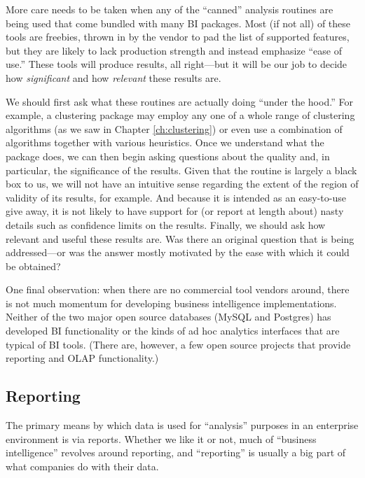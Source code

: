 More care needs to be taken when any of the ``canned'' analysis
routines are being used that come bundled with many BI packages. Most
(if not all) of these tools are freebies, thrown in by the vendor to
pad the list of supported features, but they are likely to lack
production strength and instead emphasize ``ease of use.'' These tools
will produce results, all right---but it will be our job to decide how
\emph{significant} and how \emph{relevant} these results are.
    
We should first ask what these routines are actually doing ``under the
hood.'' For example, a clustering package may employ any one of a
whole range of clustering algorithms (as we saw in Chapter
\ref{ch:clustering}) or even use a combination of algorithms together
with various heuristics.  Once we understand what the package does, we
can then begin asking questions about the quality and, in particular,
the significance of the results.  Given that the routine is largely a
black box to us, we will not have an intuitive sense regarding the
extent of the region of validity of its results, for example. And
because it is intended as an easy-to-use give away, it is not likely
to have support for (or report at length about) nasty details such as
confidence limits on the results.  Finally, we should ask how relevant
and useful these results are.  Was there an original question that is
being addressed---or was the answer mostly motivated by the ease with
which it could be obtained?
    
One final observation: when there are no commercial tool vendors
around, there is not much momentum for developing business
intelligence implementations. Neither of the two major open source
databases (MySQL and Postgres) has developed BI functionality or the
kinds of ad hoc analytics interfaces that are typical of BI tools.
(There are, however, a few open source projects that provide reporting
and OLAP functionality.)

\subsection{Reporting}


The primary means by which data is used for ``analysis'' purposes in
an enterprise environment is via reports.  Whether we like it or not,
much of ``business intelligence'' revolves around reporting, and
``reporting'' is usually a big part of what companies do with their
data.

